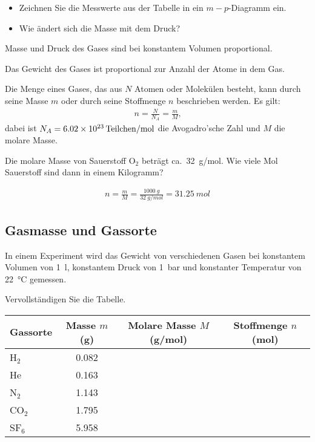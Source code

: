 \documentclass[12pt,a4paper,twoside]{article}
\begin{document}
\begin{aufgabe}
	\begin{itemize}
		\item Zeichnen Sie die Messwerte aus der Tabelle in ein $m-p$-Diagramm ein.
		\item Wie ändert sich die Masse mit dem Druck?
	\end{itemize}
	\begin{loesung}
	Masse und Druck des Gases sind bei konstantem Volumen proportional.	
	\end{loesung}

\end{aufgabe}

Das Gewicht des Gases ist proportional zur Anzahl der Atome in dem Gas.


Die Menge eines Gases, das aus $N$ Atomen oder Molekülen besteht, kann durch seine Masse $m$
oder durch seine Stoffmenge $n$ beschrieben werden.
Es gilt:
\begin{eqnarray*}
	n=\frac{N}{N_A}=\frac{m}{M}\text{,} 
\end{eqnarray*}
dabei ist $N_A=\SI{6.02E23}{Teilchen/mol}$ die Avogadro'sche Zahl und $M$ die molare Masse.

\begin{aufgabe}
	Die molare Masse von Sauerstoff O$_2$ beträgt ca.~\SI{32}{g/mol}.
	Wie viele Mol Sauerstoff sind dann in einem Kilogramm?
	\begin{loesung}
		\begin{eqnarray*}
		n=\frac{m}{M}=\frac{\SI{1000}{g}}{\SI{32}{g/mol}}=\SI{31.25}{mol}
		\end{eqnarray*}
	\end{loesung}
\end{aufgabe}


\subsection*{Gasmasse und Gassorte}

In einem Experiment wird das Gewicht von verschiedenen Gasen bei konstantem Volumen von \SI{1}{l},
konstantem Druck von \SI{1}{bar} und konstanter Temperatur von \SI{22}{\celsius} gemessen.

Vervollständigen Sie die Tabelle.
\begin{center}
\begin{tabular}{lccc}
	Gassorte  & Masse $m$ (g) & Molare Masse $M$ (g/mol)  & Stoffmenge $n$ (mol)\\\hline
	H$_2$     & \num{0.082}   & &\\
	He        & \num{0.163}   & &\\
	N$_2$     & \num{1.143}   & &\\
	CO$_2$    & \num{1.795}   & &\\
	SF$_6$    & \num{5.958}   & &\\
\end{tabular}
\end{center}
\end{document}
